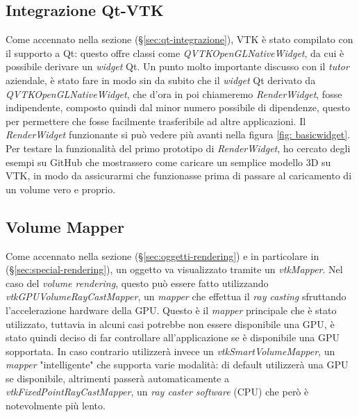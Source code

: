 \subsection{Integrazione Qt-VTK}
Come accennato nella sezione  (§\ref{sec:qt-integrazione}), VTK è stato compilato con il supporto a Qt: questo offre classi come \emph{QVTKOpenGLNativeWidget}, da cui è possibile derivare un \emph{widget} Qt. Un punto molto importante discusso con il \emph{tutor} aziendale, è stato fare in modo sin da subito che il \emph{widget} Qt derivato da \emph{QVTKOpenGLNativeWidget}, che d'ora in poi chiameremo \emph{RenderWidget}, fosse indipendente, composto quindi dal minor numero possibile di dipendenze, questo per permettere che fosse facilmente trasferibile ad altre applicazioni. Il \emph{RenderWidget} funzionante si può vedere più avanti nella figura \ref{fig: basicwidget}.
\\
Per testare la funzionalità del primo prototipo di \emph{RenderWidget}, ho cercato degli esempi su GitHub che mostrassero come caricare un semplice modello 3D su VTK, in modo da assicurarmi che funzionasse prima di passare al caricamento di un volume vero e proprio.

\subsection{Volume Mapper}
Come accennato nella sezione  (§\ref{sec:oggetti-rendering}) e in particolare in  (§\ref{sec:special-rendering}), un oggetto va visualizzato tramite un \emph{vtkMapper}. Nel caso del \emph{volume rendering}, questo può essere fatto utilizzando \emph{vtkGPUVolumeRayCastMapper}, un \emph{mapper} che effettua il \emph{ray casting} sfruttando l'accelerazione hardware della GPU. Questo è il \emph{mapper} principale che è stato utilizzato, tuttavia in alcuni casi potrebbe non essere disponibile una GPU, è stato quindi deciso di far controllare all'applicazione se è disponibile una GPU sopportata. In caso contrario utilizzerà invece un \emph{vtkSmartVolumeMapper}, un \emph{mapper} "intelligente" che supporta varie modalità: di default utilizzerà una GPU se disponibile, altrimenti passerà automaticamente a \emph{vtkFixedPointRayCastMapper}, un \emph{ray caster} \emph{software} (CPU) che però è notevolmente più lento.

